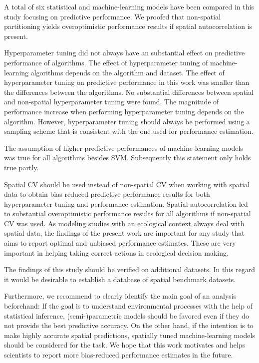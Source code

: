\documentclass[review]{elsarticle}
\begin{document}
\noindent A total of six statistical and machine-learning models have been compared in this study focusing on predictive performance.
We proofed that non-spatial partitioning yields overoptimistic performance results if spatial autocorrelation is present.

Hyperparameter tuning did not always have an substantial effect on predictive performance of algorithms.
The effect of hyperparameter tuning of machine-learning algorithms depends on the algorithm and dataset.
The effect of hyperparameter tuning on predictive performance in this work was smaller than the differences between the algorithms.
No substantial differences between spatial and non-spatial hyperparameter tuning were found.
The magnitude of performance increase when performing hyperparameter tuning depends on the algorithm.
However, hyperparameter tuning should always be performed using a sampling scheme that is consistent with the one used for performance estimation.

The assumption of higher predictive performances of machine-learning models was true for all algorithms besides SVM.
Subsequently this statement only holds true partly.

Spatial \ac{CV} should be used instead of non-spatial \ac{CV} when working with spatial data to obtain bias-reduced predictive performance results for both hyperparameter tuning and performance estimation.
Spatial autocorrelation led to substantial overoptimistic performance results for all algorithms if non-spatial CV was used.
As modeling studies with an ecological context always deal with spatial data, the findings of the present work are important for any study that aims to report optimal and unbiased performance estimates.
These are very important in helping taking correct actions in ecological decision making.

The findings of this study should be verified on additional datasets. 
In this regard it would be desirable to establish a database of spatial benchmark datasets.

Furthermore, we recommend to clearly identify the main goal of an analysis beforehand:
If the goal is to understand environmental processes with the help of statistical inference, (semi-)parametric models should be favored even if they do not provide the best predictive accuracy.
On the other hand, if the intention is to make highly accurate spatial predictions, spatially tuned machine-learning models should be considered for the task.
We hope that this work motivates and helps scientists to report more bias-reduced performance estimates in the future.
\end{document}
